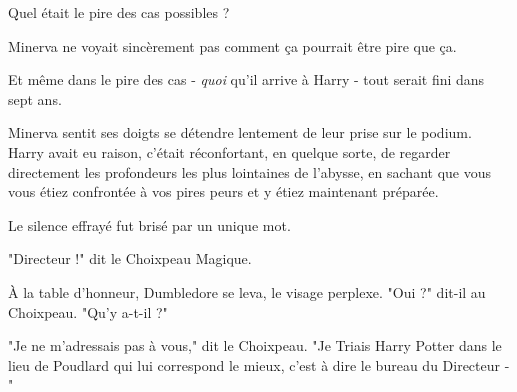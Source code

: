 Quel était le pire des cas possibles ?

Minerva ne voyait sincèrement pas comment ça pourrait être pire que ça.

Et même dans le pire des cas - \emph{quoi}  qu'il arrive à Harry - tout serait fini dans sept ans.

Minerva sentit ses doigts se détendre lentement de leur prise sur le podium. Harry avait eu raison, c'était réconfortant, en quelque sorte, de regarder directement les profondeurs les plus lointaines de l'abysse, en sachant que vous vous étiez confrontée à vos pires peurs et y étiez maintenant préparée.

Le silence effrayé fut brisé par un unique mot.

"Directeur !" dit le Choixpeau Magique.

À la table d'honneur, Dumbledore se leva, le visage perplexe. "Oui ?" dit-il au Choixpeau. "Qu'y a-t-il ?"

"Je ne m'adressais pas à vous," dit le Choixpeau. "Je Triais Harry Potter dans le lieu de Poudlard qui lui correspond le mieux, c'est à dire le bureau du Directeur -"

